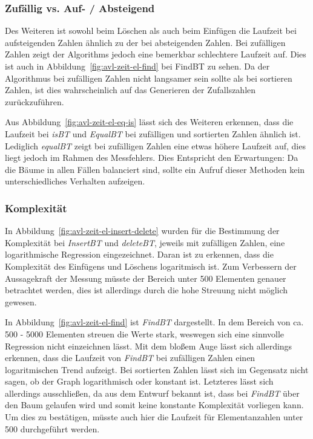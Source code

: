 \subsubsection{Zufällig vs. Auf- / Absteigend}
Des Weiteren ist sowohl beim Löschen als auch beim Einfügen die Laufzeit bei aufsteigenden Zahlen
ähnlich zu der bei absteigenden Zahlen.
Bei zufälligen Zahlen zeigt der Algorithms jedoch eine bemerkbar schlechtere Laufzeit auf.
Dies ist auch in Abbildung~\ref{fig:avl-zeit-el-find} bei FindBT zu sehen.
Da der Algorithmus bei zufälligen Zahlen nicht langsamer sein sollte als bei sortieren Zahlen, ist
dies wahrscheinlich auf das Generieren der Zufallszahlen zurückzuführen.

Aus Abbildung~\ref{fig:avl-zeit-el-eq-is} lässt sich des Weiteren erkennen, dass die Laufzeit
bei \textit{isBT} und \textit{EqualBT} bei zufälligen und sortierten Zahlen ähnlich ist.
Lediglich \textit{equalBT} zeigt bei zufälligen Zahlen eine etwas höhere Laufzeit auf, dies liegt
jedoch im Rahmen des Messfehlers.
Dies Entspricht den Erwartungen: Da die Bäume in allen Fällen balanciert sind, sollte ein Aufruf
dieser Methoden kein unterschiedliches Verhalten aufzeigen.

\subsubsection{Komplexität}
In Abbildung~\ref{fig:avl-zeit-el-insert-delete} wurden für die Bestimmung der Komplexität
bei \textit{InsertBT} und \textit{deleteBT}, jeweils mit zufälligen Zahlen, eine logarithmische
Regression eingezeichnet.
Daran ist zu erkennen, dass die Komplexität des Einfügens und Löschens logaritmisch ist.
Zum Verbessern der Aussagekraft der Messung müsste der Bereich unter 500 Elementen genauer
betrachtet werden, dies ist allerdings durch die hohe Streuung nicht möglich gewesen.

In Abbildung~\ref{fig:avl-zeit-el-find} ist \textit{FindBT} dargestellt.
In dem Bereich von ca. 500 - 5000 Elementen streuen die Werte stark, weswegen sich eine sinnvolle
Regression nicht einzeichnen lässt.
Mit dem bloßem Auge lässt sich allerdings erkennen, dass die Laufzeit von \textit{FindBT} bei
zufälligen
Zahlen einen logaritmischen Trend aufzeigt.
Bei sortierten Zahlen lässt sich im Gegensatz nicht sagen, ob der Graph logarithmisch oder konstant
ist.
Letzteres lässt sich allerdings ausschließen, da aus dem Entwurf bekannt ist, dass bei
\textit{FindBT} über
den Baum gelaufen wird und somit keine konstante Komplexität vorliegen kann.
Um dies zu bestätigen, müsste auch hier die Laufzeit für Elementanzahlen unter 500
durchgeführt werden.

